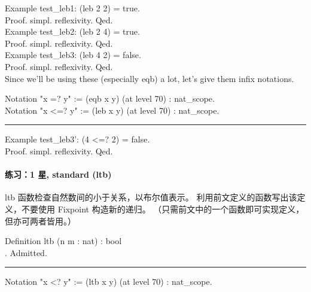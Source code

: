\documentclass[utf8]{ctexart}
\let\oldparagraph\paragraph
\renewcommand{\paragraph}[1]{\oldparagraph{#1}\mbox{}}
\begin{document}
{Example} {test\_leb1}: ({leb} 2 2) = {true}.\\
{Proof}. {simpl}. {reflexivity}. {Qed}.\\
{Example} {test\_leb2}: ({leb} 2 4) = {true}.\\
{Proof}. {simpl}. {reflexivity}. {Qed}.\\
{Example} {test\_leb3}: ({leb} 4 2) = {false}.\\
{Proof}. {simpl}. {reflexivity}. {Qed}.\\

Since we'll be using these (especially {{eqb}}) a lot, let's give them
infix notations.

{Notation} "x =? y" := ({eqb} {x} {y}) ({at} {level} 70) :
{nat\_scope}.\\
{Notation} "x \textless=? y" := ({leb} {x} {y}) ({at} {level} 70) :
{nat\_scope}.\\

\begin{center}\rule{0.5\linewidth}{\linethickness}\end{center}

{Example} {test\_leb3'}: (4 \textless=? 2) = {false}.\\
{Proof}. {simpl}. {reflexivity}. {Qed}.\\

\protect\hypertarget{lab32}{}{}

\hypertarget{ux7ec3ux4e601-ux661f-standard-ltb}{%
\paragraph{练习：1 星, standard
(ltb)}\label{ux7ec3ux4e601-ux661f-standard-ltb}}

{{ltb}} 函数检查自然数间的小于关系，以布尔值表示。
利用前文定义的函数写出该定义，不要使用 {{Fixpoint}} 构造新的递归。
（只需前文中的一个函数即可实现定义，但亦可两者皆用。）

{Definition} {ltb} ({n} {m} : {nat}) : {bool}\\
\hspace*{0.333em}\hspace*{0.333em}{(*~将本行替换成~":=~\_你的\_定义\_~."~*)}.
{Admitted}.\\

\begin{center}\rule{0.5\linewidth}{\linethickness}\end{center}

{Notation} "x \textless? y" := ({ltb} {x} {y}) ({at} {level} 70) :
{nat\_scope}.\\
\end{document}

